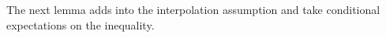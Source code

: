 \documentclass[12pt]{article}
\begin{document}
    The next lemma adds into the interpolation assumption and take conditional expectations on the inequality. 
\end{document}
